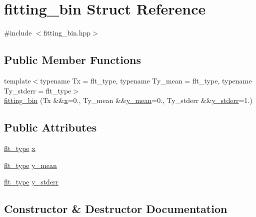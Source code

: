 \hypertarget{structfitting__bin}{}\section{fitting\+\_\+bin Struct Reference}
\label{structfitting__bin}


{\ttfamily \#include $<$fitting\+\_\+bin.\+hpp$>$}

\subsection*{Public Member Functions}
\begin{DoxyCompactItemize}
\item 
{\footnotesize template$<$typename Tx  = flt\+\_\+type, typename Ty\+\_\+mean  = flt\+\_\+type, typename Ty\+\_\+stderr  = flt\+\_\+type$>$ }\\\hyperlink{structfitting__bin_a39e40a834cd7624af91b3c56fe162729}{fitting\+\_\+bin} (Tx \&\&\hyperlink{structfitting__bin_a7b98fe0d678f3a4fcf198240bc3b93ad}{x}=0., Ty\+\_\+mean \&\&\hyperlink{structfitting__bin_a96cd30fcacd3caad74b5467adb552acf}{y\+\_\+mean}=0., Ty\+\_\+stderr \&\&\hyperlink{structfitting__bin_a94fbb052ddb257465dfd714a06614817}{y\+\_\+stderr}=1.)
\end{DoxyCompactItemize}
\subsection*{Public Attributes}
\begin{DoxyCompactItemize}
\item 
\hyperlink{lib_2IceBRG__main_2common_8h_ad0f130a56eeb944d9ef2692ee881ecc4}{flt\+\_\+type} \hyperlink{structfitting__bin_a7b98fe0d678f3a4fcf198240bc3b93ad}{x}
\item 
\hyperlink{lib_2IceBRG__main_2common_8h_ad0f130a56eeb944d9ef2692ee881ecc4}{flt\+\_\+type} \hyperlink{structfitting__bin_a96cd30fcacd3caad74b5467adb552acf}{y\+\_\+mean}
\item 
\hyperlink{lib_2IceBRG__main_2common_8h_ad0f130a56eeb944d9ef2692ee881ecc4}{flt\+\_\+type} \hyperlink{structfitting__bin_a94fbb052ddb257465dfd714a06614817}{y\+\_\+stderr}
\end{DoxyCompactItemize}


\subsection{Constructor \& Destructor Documentation}
\hypertarget{structfitting__bin_a39e40a834cd7624af91b3c56fe162729}{}
